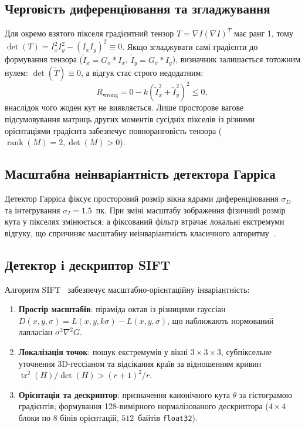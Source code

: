 \documentclass[14pt, a4paper]{extarticle}
\begin{document}
\subsection{Черговість диференціювання та згладжування}
Для окремо взятого пікселя градієнтний тензор $T = \nabla I (\nabla I)^T$ має ранг 1, тому $\det(T) = I_x^2 I_y^2 - (I_x I_y)^2 \equiv 0$. Якщо згладжувати самі градієнти до формування тензора ($\tilde{I}_x = G_\sigma * I_x$, $\tilde{I}_y = G_\sigma * I_y$), визначник залишається тотожним нулем: $\det(\tilde{T}) \equiv 0$, а відгук стає строго недодатним:
\begin{equation}
    R_{\text{wrong}} = 0 - k (\tilde{I}_x^2 + \tilde{I}_y^2)^2 \le 0,
\end{equation}
внаслідок чого жоден кут не виявляється. Лише просторове вагове підсумовування матриць других моментів сусідніх пікселів із різними орієнтаціями градієнта забезпечує повноранговість тензора ($\operatorname{rank}(M) = 2, \det(M) > 0$).

\subsection{Масштабна неінваріантність детектора Гарріса}
Детектор Гарріса фіксує просторовий розмір вікна ядрами диференціювання $\sigma_D$ та інтегрування $\sigma_I = 1.5$~пк. При зміні масштабу зображення фізичний розмір кута у пікселях змінюється, а фіксований фільтр втрачає локальні екстремуми відгуку, що спричиняє масштабну неінваріантність класичного алгоритму~\cite{szeliski2022computer}.

\subsection{Детектор і дескриптор SIFT}
Алгоритм SIFT~\cite{lowe2004distinctive} забезпечує масштабно-орієнтаційну інваріантність:
\begin{enumerate}
    \item \textbf{Простір масштабів}: піраміда октав із різницями гауссіан $D(x, y, \sigma) = L(x, y, k\sigma) - L(x, y, \sigma)$, що наближають нормований лапласіан $\sigma^2 \nabla^2 G$.
    \item \textbf{Локалізація точок}: пошук екстремумів у вікні $3 \times 3 \times 3$, субпіксельне уточнення 3D-гессіаном та відсікання країв за відношенням кривин $\operatorname{tr}^2(H)/\det(H) > (r+1)^2/r$.
    \item \textbf{Орієнтація та дескриптор}: призначення канонічного кута $\theta$ за гістограмою градієнтів; формування 128-вимірного нормалізованого дескриптора ($4 \times 4$ блоки по 8 бінів орієнтацій, $512$~байтів \texttt{float32}).
\end{enumerate}
\end{document}

